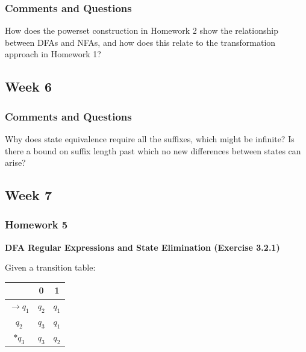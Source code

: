 \documentclass{article}
\theoremstyle{theorem}
\theoremstyle{definition}
\theoremstyle{remark}
\begin{document}
\subsubsection*{Comments and Questions}

How does the powerset construction in Homework 2 show the relationship between DFAs and NFAs, and how does this relate to the transformation approach in Homework 1?

\subsection{Week 6}


\subsubsection*{Comments and Questions}

Why does state equivalence require all the suffixes, which might be infinite? Is there a bound on suffix length past which no new differences between states can arise?

\subsection{Week 7}


\subsubsection*{Homework 5}

\textbf{DFA Regular Expressions and State Elimination (Exercise 3.2.1)}

Given a transition table:
\begin{center}
\begin{tabular}{|c|c|c|}
\hline
       & 0   & 1   \\ \hline
$\rightarrow q_1$ & $q_2$ & $q_1$ \\ \hline
$q_2$ & $q_3$ & $q_1$ \\ \hline
$*q_3$ & $q_3$ & $q_2$ \\ \hline
\end{tabular}
\end{center}
\end{document}
